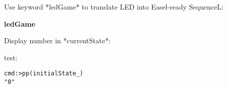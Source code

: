 \documentclass{../src/led_doc}
\begin{document}
\begin{ledCmnt}
Use keyword *ledGame* to translate LED into Easel-ready SequenceL:
\end{ledCmnt}
\textbf{ledGame}
\begin{ledDef}
\end{ledDef}

\begin{ledDef}
\end{ledDef}

\begin{ledCmnt}
Display number in *currentState*:
\end{ledCmnt}

\begin{ledDef}
\end{ledDef}

\begin{ledCmnt}
test:
\begin{verbatim}
cmd:>pp(initialState_)
"0"
\end{verbatim}
\end{ledCmnt}
\end{document}
